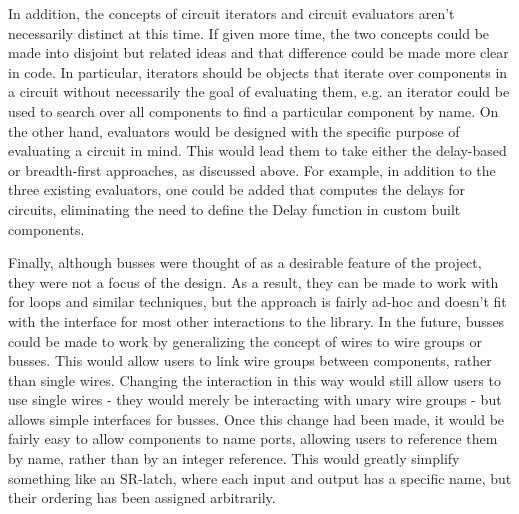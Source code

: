 \documentclass{article}
\begin{document}
In addition, the concepts of circuit iterators and circuit evaluators aren’t necessarily distinct at this time. If given more time, the two concepts could be made into disjoint but related ideas and that difference could be made more clear in code. In particular, iterators should be objects that iterate over components in a circuit without necessarily the goal of evaluating them, e.g. an iterator could be used to search over all components to find a particular component by name. On the other hand, evaluators would be designed with the specific purpose of evaluating a circuit in mind. This would lead them to take either the delay-based or breadth-first approaches, as discussed above. For example, in addition to the three existing evaluators, one could be added that computes the delays for circuits, eliminating the need to define the Delay function in custom built components.

Finally, although busses were thought of as a desirable feature of the project, they were not a focus of the design. As a result, they can be made to work with for loops and similar techniques, but the approach is fairly ad-hoc and doesn’t fit with the interface for most other interactions to the library. In the future, busses could be made to work by generalizing the concept of wires to wire groups or busses. This would allow users to link wire groups between components, rather than single wires. Changing the interaction in this way would still allow users to use single wires - they would merely be interacting with unary wire groups - but allows simple interfaces for busses. Once this change had been made, it would be fairly easy to allow components to name ports, allowing users to reference them by name, rather than by an integer reference. This would greatly simplify something like an SR-latch, where each input and output has a specific name, but their ordering has been assigned arbitrarily.



\end{document}
